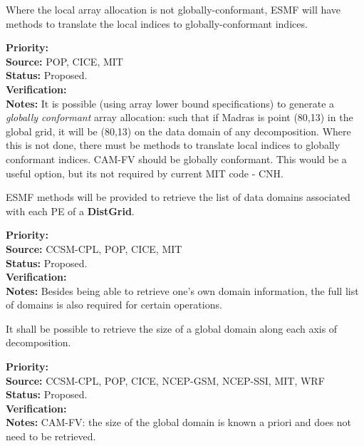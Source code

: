 
Where the local array allocation is not globally-conformant, 
ESMF will have methods to translate the local indices to
globally-conformant indices.

\begin{reqlist}
{\bf Priority:} \\
{\bf Source:} POP, CICE, MIT \\
{\bf Status:} Proposed. \\
{\bf Verification:} \\
{\bf Notes:} It is possible (using array lower bound specifications)
  to generate a \emph{globally conformant} array allocation: such that
  if Madras is point (80,13) in the global grid, it will be (80,13) on
  the data domain of any decomposition. Where this is not done, there
  must be methods to translate local indices to globally conformant
  indices.  CAM-FV should be globally conformant. 
  This would be a useful option, but its not
  required by current MIT code - CNH.
\end{reqlist}


ESMF methods will be provided to retrieve the list of data
domains associated with each PE of a  \textbf{DistGrid}.

\begin{reqlist}
{\bf Priority:} \\
{\bf Source:} CCSM-CPL, POP, CICE, MIT \\
{\bf Status:} Proposed. \\
{\bf Verification:} \\
{\bf Notes:} Besides being able to retrieve one's own domain
  information, the full list of domains is also required for certain
  operations.
\end{reqlist}



It shall be possible to retrieve the size of a global domain
along each axis of decomposition.

\begin{reqlist}
{\bf Priority:} \\
{\bf Source:} CCSM-CPL, POP, CICE, NCEP-GSM, NCEP-SSI, MIT, WRF \\
{\bf Status:} Proposed. \\
{\bf Verification:} \\
{\bf Notes:} CAM-FV: the size of the global domain is known
a priori and does not need to be retrieved.
\end{reqlist}

